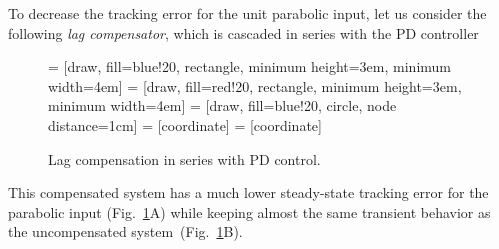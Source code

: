 \documentclass[a4paper,11pt]{report}
\theoremstyle{definition}
\newcommand{\re}{\mathrm{ref}}
\begin{document}
To decrease the tracking error for the unit parabolic input, let us
consider the following \emph{lag compensator}, which is cascaded in
series with the PD controller
\begin{figure}[H]
  \label{fig:lag}
  \centering
   = [draw, fill=blue!20, rectangle, minimum height=3em, minimum width=4em]
   = [draw, fill=red!20, rectangle, minimum height=3em, minimum width=4em]
   = [draw, fill=blue!20, circle, node distance=1cm]
   = [coordinate]
   = [coordinate]
  \caption{Lag compensation in series with PD control.}
\end{figure}

This compensated system has a much lower steady-state tracking error
for the parabolic input (Fig.~\ref{fig:lag}A) while keeping almost the
same transient behavior as the uncompensated
system~(Fig.~\ref{fig:lag}B).
\end{document}

